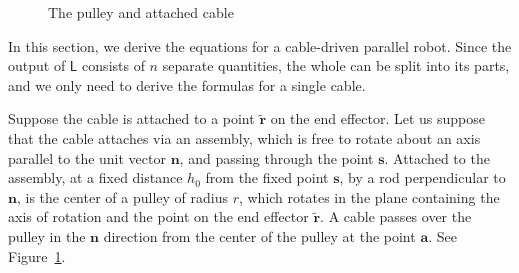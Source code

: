\documentclass[reqno,12pt]{amsart}
\begin{document}
\begin{figure}


\caption{The pulley and attached cable}
\label{pulley}
\end{figure}

In this section, we derive the equations for a cable-driven parallel robot.  Since the output of $\mathsf L$ consists of $n$ separate quantities, the whole can be split into its parts, and we only need to derive the formulas for a single cable.

Suppose the cable is attached to a point $\tilde{\bm r}$ on the end effector.  Let us suppose that the cable attaches via an assembly, which is free to rotate about an axis parallel to the unit vector $\bm n$, and passing through the point $\bm s$.  Attached to the assembly, at a fixed distance $h_0$ from the fixed point $\bm s$, by a rod perpendicular to $\bm n$, is the center of a pulley of radius $r$, which rotates in the plane containing the axis of rotation and the point on the end effector $\tilde{\bm r}$.  A cable passes over the pulley in the $\bm n$ direction from the center of the pulley at the point $\bm a$.  See Figure~\ref{pulley}.
\end{document}

